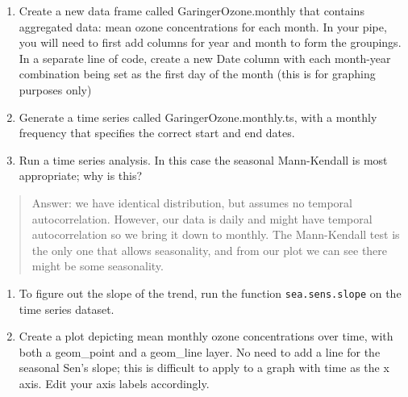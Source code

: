 \documentclass[]{article}
\begin{document}
\begin{enumerate}
\def\labelenumi{\arabic{enumi}.}
\setcounter{enumi}{8}
\item
  Create a new data frame called GaringerOzone.monthly that contains
  aggregated data: mean ozone concentrations for each month. In your
  pipe, you will need to first add columns for year and month to form
  the groupings. In a separate line of code, create a new Date column
  with each month-year combination being set as the first day of the
  month (this is for graphing purposes only)
\item
  Generate a time series called GaringerOzone.monthly.ts, with a monthly
  frequency that specifies the correct start and end dates.
\item
  Run a time series analysis. In this case the seasonal Mann-Kendall is
  most appropriate; why is this?
\end{enumerate}

\begin{quote}
Answer: we have identical distribution, but assumes no temporal
autocorrelation. However, our data is daily and might have temporal
autocorrelation so we bring it down to monthly. The Mann-Kendall test is
the only one that allows seasonality, and from our plot we can see there
might be some seasonality.
\end{quote}

\begin{enumerate}
\def\labelenumi{\arabic{enumi}.}
\setcounter{enumi}{11}
\item
  To figure out the slope of the trend, run the function
  \texttt{sea.sens.slope} on the time series dataset.
\item
  Create a plot depicting mean monthly ozone concentrations over time,
  with both a geom\_point and a geom\_line layer. No need to add a line
  for the seasonal Sen's slope; this is difficult to apply to a graph
  with time as the x axis. Edit your axis labels accordingly.
\end{enumerate}
\end{document}
